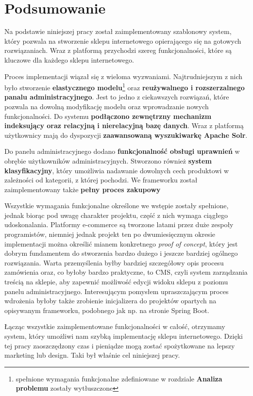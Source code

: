 \chapter{Podsumowanie}
\thispagestyle{chapterBeginStyle}

Na podstawie niniejszej pracy został zaimplementowany szablonowy system, który pozwala na stworzenie sklepu internetowego opierającego się na gotowych rozwiązaniach. Wraz z platformą przychodzi szereg funkcjonalności, które są kluczowe dla każdego sklepu internetowego. 

Proces implementacji wiązał się z wieloma wyzwaniami. Najtrudniejszym z nich było stworzenie \textbf{elastycznego modelu}\footnote{spełnione wymagania funkcjonalne zdefiniowane w rozdziale \textbf{Analiza problemu} zostały wytłuszczone} oraz \textbf{reużywalnego i rozszerzalnego panalu administracyjnego}. Jest to jedno z ciekawszych rozwiązań, które pozwala na dowolną modyfikację modelu oraz wprowadzanie nowych funkcjonalności. Do systemu \textbf{podłączono zewnętrzny mechanizm indeksujący oraz relacyjną i nierelacyjną bazę danych}. Wraz z platformą użytkownicy mają do dyspozycji \textbf{zaawansowaną wyszukiwarkę Apache Solr}.

Do panelu administracyjnego dodano \textbf{funkcjonalność obsługi uprawnień} w obrębie użytkowników administracyjnych. Stworzono również \textbf{system klasyfikacyjny}, który umożliwia nadawanie dowolnych cech produktowi w zależności od kategorii, z której pochodzi. We frameworku został zaimplementowany także \textbf{pełny proces zakupowy} 

Wszystkie wymagania funkcjonalne określone we wstępie zostały spełnione, jednak biorąc pod uwagę charakter projektu, część z nich wymaga ciągłego udoskonalania. Platformy e-commerce są tworzone latami przez duże zespoły programistów, niemniej jednak projekt ten po dwumiesięcznym okresie implementacji można określić mianem konkretnego \textit{proof of concept}, który jest dobrym fundamentem do stworzenia bardzo dużego i jeszcze bardziej ogólnego rozwiązania. Warta przemyślenia byłby bardziej szczegółowy opis procesu zamówienia oraz, co byłoby bardzo praktyczne, to CMS, czyli system zarządzania treścią na sklepie, aby zapewnić możliwość edycji widoku sklepu z poziomu panelu administracyjnego. Interesującym pomysłem upraszczającym proces wdrożenia byłoby także zrobienie inicjalizera do projektów opartych na opisywanym frameworku, podobnego jak np. na stronie Spring Boot. 

Łącząc wszystkie zaimplementowane funkcjonalności w całość, otrzymamy system, który umożliwi nam szybką implementację sklepu internetowego. Dzięki tej pracy zaoszczędzony czas i pieniądze mogą zostać spożytkowane na lepszy marketing lub design. Taki był właśnie cel niniejszej pracy.  
